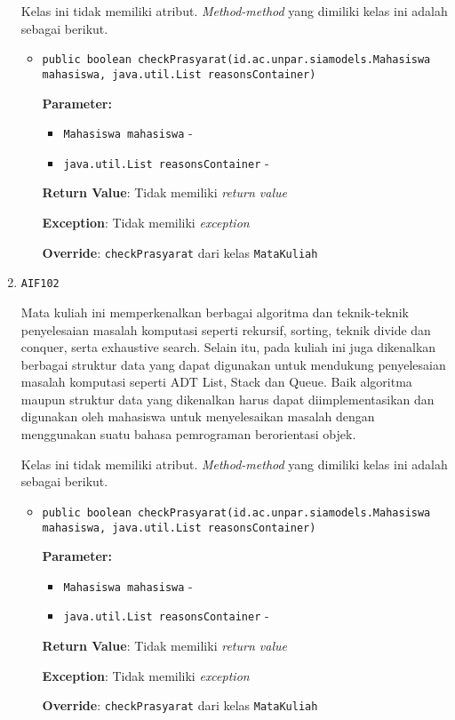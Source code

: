 \documentclass{article}
\begin{document}
\begin{enumerate}
Kelas ini tidak memiliki atribut. \textit{Method-method} yang dimiliki kelas ini adalah sebagai berikut.
\begin{itemize}
\item \texttt{public boolean checkPrasyarat(id.ac.unpar.siamodels.Mahasiswa mahasiswa, java.util.List reasonsContainer)}

\textbf{Parameter:}
\begin{itemize}
\item \texttt{Mahasiswa mahasiswa} - 
\item \texttt{java.util.List reasonsContainer} - 
\end{itemize}
\textbf{Return Value}: Tidak memiliki \textit{return value}

\textbf{Exception}: Tidak memiliki \textit{exception}

\textbf{Override}: \texttt{checkPrasyarat} dari kelas \texttt{MataKuliah}

\end{itemize}
\item \texttt{AIF102}

Mata kuliah ini memperkenalkan berbagai algoritma dan teknik-teknik 
 penyelesaian masalah komputasi seperti rekursif, sorting, teknik divide dan 
 conquer, serta exhaustive search. Selain itu, pada kuliah ini juga 
 dikenalkan berbagai struktur data yang dapat digunakan untuk mendukung 
 penyelesaian masalah komputasi seperti ADT List, Stack dan Queue. Baik 
 algoritma maupun struktur data yang dikenalkan harus dapat diimplementasikan 
 dan digunakan oleh mahasiswa untuk menyelesaikan masalah dengan menggunakan 
 suatu bahasa pemrograman berorientasi objek.

Kelas ini tidak memiliki atribut. \textit{Method-method} yang dimiliki kelas ini adalah sebagai berikut.
\begin{itemize}
\item \texttt{public boolean checkPrasyarat(id.ac.unpar.siamodels.Mahasiswa mahasiswa, java.util.List reasonsContainer)}

\textbf{Parameter:}
\begin{itemize}
\item \texttt{Mahasiswa mahasiswa} - 
\item \texttt{java.util.List reasonsContainer} - 
\end{itemize}
\textbf{Return Value}: Tidak memiliki \textit{return value}

\textbf{Exception}: Tidak memiliki \textit{exception}

\textbf{Override}: \texttt{checkPrasyarat} dari kelas \texttt{MataKuliah}


\end{itemize}
\end{enumerate}
\end{document}
